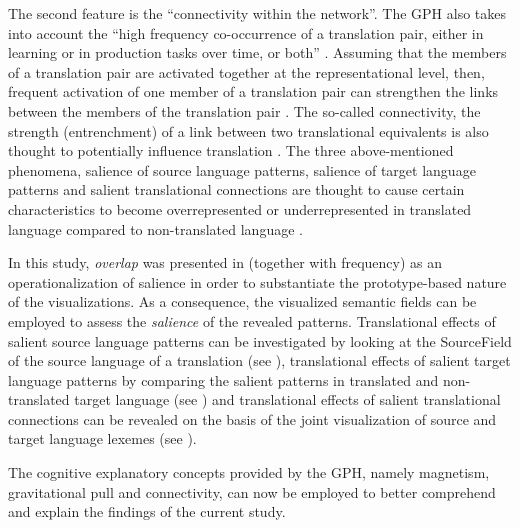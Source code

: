 The second feature is the “connectivity within the network”. The GPH also takes into account the “high frequency co-occurrence of a translation pair, either in learning or in production tasks over time, or both” \citep[14]{de_sutter_developing_2017}. Assuming that the members of a translation pair are activated together at the representational level, then, frequent activation of one member of a translation pair can strengthen the links between the members of the translation pair \citep[14]{de_sutter_developing_2017}. The so-called connectivity, the strength (entrenchment) of a link between two translational equivalents is also thought to potentially influence translation \citep[15]{de_sutter_developing_2017}. The three above-mentioned phenomena, salience of source language patterns, salience of target language patterns and salient translational connections are thought to cause certain characteristics to become overrepresented or underrepresented in translated language compared to non-translated language \citep{de_sutter_developing_2017}.

In this study, \textit{overlap} was presented in  (together with frequency) as an operationalization of salience in order to substantiate the prototype-based nature of the visualizations. As a consequence, the visualized semantic fields can be employed to assess the \textit{salience} of the revealed patterns. Translational effects of salient source language patterns can be investigated by looking at the SourceField of the source language of a translation (see ), translational effects of salient target language patterns by comparing the salient patterns in translated and non-translated target language (see ) and translational effects of salient translational connections can be revealed on the basis of the joint visualization of source and target language lexemes (see ).

The cognitive explanatory concepts provided by the GPH, namely magnetism, gravitational pull and connectivity, can now be employed to better comprehend and explain the findings of the current study.

